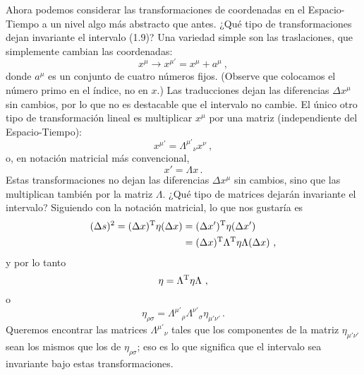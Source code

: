 \documentclass[11pt,b5paper,openany,twoside]{book}
\begin{document}
Ahora podemos considerar las transformaciones de coordenadas en el Espacio-Tiempo a un nivel algo más abstracto que antes.
¿Qué tipo de transformaciones dejan invariante el intervalo (1.9)? Una variedad simple son las traslaciones, que simplemente cambian las coordenadas:
\begin{equation}
x^\mu \rightarrow x^{\mu'} = x^\mu + a^\mu\ ,\label{1.10}
\end{equation}
donde $a^\mu$ es un conjunto de cuatro números fijos.
(Observe que colocamos el número primo en el índice, no en $x$.)
Las traducciones dejan las diferencias $\Delta x^\mu$ sin cambios, por lo que no es destacable que el intervalo no cambie.
El único otro tipo de transformación lineal es multiplicar $x^\mu$ por una matriz (independiente del Espacio-Tiempo):
\begin{equation}
x^{\mu'} = \Lambda^{\mu'}{}_\nu x^\nu\ , \label{1.11}
\end{equation}
o, en notación matricial más convencional,
\begin{equation}
x' = \Lambda x\,.\label{1.12}
\end{equation}
Estas transformaciones no dejan las diferencias $\Delta x^\mu$ sin cambios, sino que las multiplican también por la matriz $\Lambda$.
¿Qué tipo de matrices dejarán invariante el intervalo? Siguiendo con la notación matricial, lo que nos gustaría es
\begin{align}
(\Delta s)^2 = (\Delta x)^{\rm T} \eta (\Delta x)
& = (\Delta x')^{\rm T} \eta (\Delta x')\nonumber \\
& = (\Delta x)^{\rm T} \Lambda^{\rm T} \eta \Lambda (\Delta x)\ ,
\label{1.13}
\end{align}
y por lo tanto
\begin{equation}
\eta = \Lambda^{\rm T} \eta \Lambda \ ,\label{1.14}
\end{equation}
o
\begin{equation}
\eta_{\rho\sigma} = \Lambda^{\mu'}{}_{\rho}\Lambda^{\nu'}{}_{\sigma}
\eta_{\mu'\nu'}\,. \label{1.15}
\end{equation}
Queremos encontrar las matrices $\Lambda^{\mu'}{}_\nu$ tales que los componentes de la matriz $\eta_{\mu'\nu'}$ sean los mismos que los de $\eta_{\rho\sigma}$; eso es lo que significa que el intervalo sea invariante bajo estas transformaciones.
\end{document}

